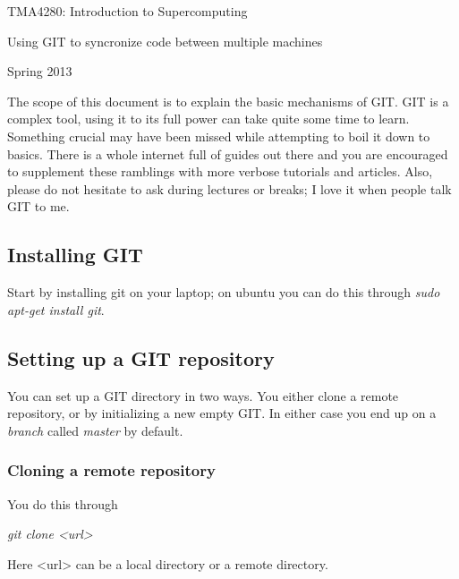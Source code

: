 \documentclass[twoside, 11pt, a4paper]{article}
\begin{document}
\LARGE
\begin{center}
TMA4280: Introduction to Supercomputing
\end{center}
\vspace{1in}

\begin{center}
{Using GIT to syncronize code between multiple machines}
\end{center}

\Large
\vspace{0.5in}
\begin{center}
Spring 2013
\end{center}

\vspace{0.5in}

\large

\newpage
The scope of this document is to explain the basic mechanisms of GIT.
GIT is a complex tool, using it to its full power can take quite some 
time to learn. Something crucial may have been missed while 
attempting to boil it down to basics. There is a whole internet full of guides
out there and you are encouraged to supplement these ramblings with more verbose
tutorials and articles. Also, please do not hesitate to ask during lectures
or breaks; I love it when people talk GIT to me.

\subsection*{Installing GIT}
Start by installing git on your laptop; on ubuntu you can do this through
\emph{sudo apt-get install git}.

\subsection*{Setting up a GIT repository}
You can set up a GIT directory in two ways. You either clone a remote
repository, or by initializing a new empty GIT.
In either case you end up on a \emph{branch} called \emph{master} by default.

\subsubsection*{Cloning a remote repository}
You do this through \\
\begin{center}\emph{git clone <url>}\end{center}
Here <url> can be a local directory or a remote directory.
\end{document}
